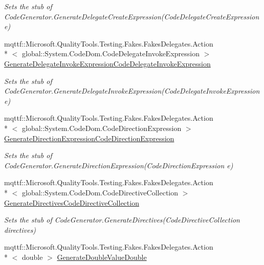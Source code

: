 \begin{DoxyCompactItemize}
\begin{DoxyCompactList}\small\item\em Sets the stub of Code\-Generator.\-Generate\-Delegate\-Create\-Expression(\-Code\-Delegate\-Create\-Expression e)\end{DoxyCompactList}\item 
mqttf\-::\-Microsoft.\-Quality\-Tools.\-Testing.\-Fakes.\-Fakes\-Delegates.\-Action\\*
$<$ global\-::\-System.\-Code\-Dom.\-Code\-Delegate\-Invoke\-Expression $>$ \hyperlink{class_system_1_1_code_dom_1_1_compiler_1_1_fakes_1_1_stub_code_compiler_a226319e4408d1be11e331dd781d8e0dc}{Generate\-Delegate\-Invoke\-Expression\-Code\-Delegate\-Invoke\-Expression}
\begin{DoxyCompactList}\small\item\em Sets the stub of Code\-Generator.\-Generate\-Delegate\-Invoke\-Expression(\-Code\-Delegate\-Invoke\-Expression e)\end{DoxyCompactList}\item 
mqttf\-::\-Microsoft.\-Quality\-Tools.\-Testing.\-Fakes.\-Fakes\-Delegates.\-Action\\*
$<$ global\-::\-System.\-Code\-Dom.\-Code\-Direction\-Expression $>$ \hyperlink{class_system_1_1_code_dom_1_1_compiler_1_1_fakes_1_1_stub_code_compiler_a43cd0a7e12ffb3f49a4147504d61c5cb}{Generate\-Direction\-Expression\-Code\-Direction\-Expression}
\begin{DoxyCompactList}\small\item\em Sets the stub of Code\-Generator.\-Generate\-Direction\-Expression(\-Code\-Direction\-Expression e)\end{DoxyCompactList}\item 
mqttf\-::\-Microsoft.\-Quality\-Tools.\-Testing.\-Fakes.\-Fakes\-Delegates.\-Action\\*
$<$ global\-::\-System.\-Code\-Dom.\-Code\-Directive\-Collection $>$ \hyperlink{class_system_1_1_code_dom_1_1_compiler_1_1_fakes_1_1_stub_code_compiler_a7649a2a32604ea40ac259613e445a50b}{Generate\-Directives\-Code\-Directive\-Collection}
\begin{DoxyCompactList}\small\item\em Sets the stub of Code\-Generator.\-Generate\-Directives(\-Code\-Directive\-Collection directives)\end{DoxyCompactList}\item 
mqttf\-::\-Microsoft.\-Quality\-Tools.\-Testing.\-Fakes.\-Fakes\-Delegates.\-Action\\*
$<$ double $>$ \hyperlink{class_system_1_1_code_dom_1_1_compiler_1_1_fakes_1_1_stub_code_compiler_a901ea0d62733c39b62e1e4a29f34d952}{Generate\-Double\-Value\-Double}

\end{DoxyCompactItemize}
